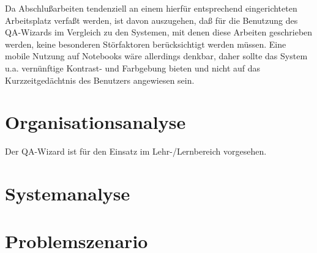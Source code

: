 \documentclass[12pt,        %
  english,ngerman,          %
  paper=a4,                 %
  captions=tablesignature,  %
  listof=numbered,          %
  bibliography=totoc,       %
  headings=small,           %
  headinclude=false,        %
  footinclude=false,        %
  parskip=half-,            %
  oneside,                  %
  BCOR=5mm,                 %
  DIV=12                    %
  ]{scrbook}                %
\begin{document}
Da Abschlußarbeiten tendenziell an einem hierfür entsprechend eingerichteten Arbeitsplatz verfaßt werden, ist davon auszugehen, daß für die Benutzung des QA-Wizards im Vergleich zu den Systemen, mit denen diese Arbeiten geschrieben werden, keine besonderen Störfaktoren berücksichtigt werden müssen. Eine mobile Nutzung auf Notebooks wäre allerdings denkbar, daher sollte das System u.a. vernünftige Kontrast- und Farbgebung bieten und nicht auf das Kurzzeitgedächtnis des Benutzers angewiesen sein.

\section{Organisationsanalyse}\label{sec:orga_ana}


Der QA-Wizard ist für den Einsatz im Lehr-/Lernbereich vorgesehen.

\section{Systemanalyse}\label{sec:sys_ana}


\section{Problemszenario}\label{sec:problem_sce}

\end{document}
